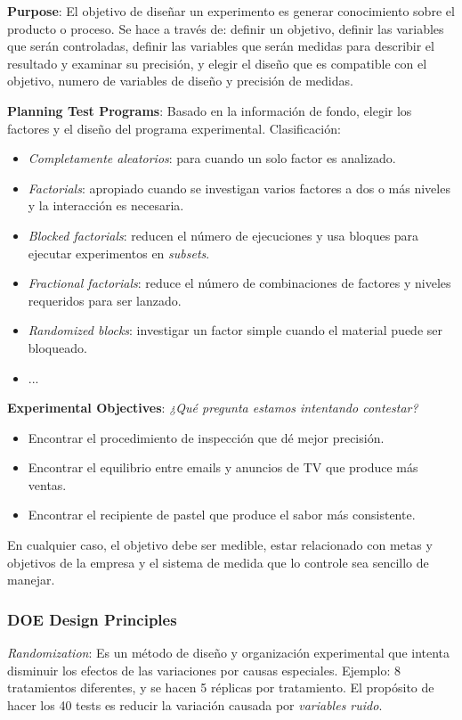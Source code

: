 \documentclass[]{article}
\begin{document}
\textbf{Purpose}: El objetivo de diseñar un experimento es generar conocimiento sobre el producto o proceso. Se hace a través de: definir un objetivo, definir las variables que serán controladas, definir las variables que serán medidas para describir el resultado y examinar su precisión, y elegir el diseño que es compatible con el objetivo, numero de variables de diseño y precisión de medidas.

\textbf{Planning Test Programs}: Basado en la información de fondo, elegir los factores y el diseño del programa experimental. Clasificación:
\begin{itemize}
	\item \textit{Completamente aleatorios}: para cuando un solo factor es analizado.
	\item \textit{Factorials}: apropiado cuando se investigan varios factores a dos o más niveles y la interacción es necesaria.
	\item \textit{Blocked factorials}: reducen el número de ejecuciones y usa bloques para ejecutar experimentos en \textit{subsets}.
	\item \textit{Fractional factorials}: reduce el número de combinaciones de factores y niveles requeridos para ser lanzado.
	\item \textit{Randomized blocks}: investigar un factor simple cuando el material puede ser bloqueado.
	\item ...
\end{itemize}
 
\textbf{Experimental Objectives}: \textit{¿Qué pregunta estamos intentando contestar?} 
\begin{itemize}
	\item Encontrar el procedimiento de inspección que dé mejor precisión.
	\item Encontrar el equilibrio entre emails y anuncios de TV que produce más ventas.
	\item Encontrar el recipiente de pastel que produce el sabor más consistente.
\end{itemize}
En cualquier caso, el objetivo debe ser medible, estar relacionado con metas y objetivos de la empresa y el sistema de medida que lo controle sea sencillo de manejar.

\subsubsection{DOE Design Principles}

\textit{Randomization}: Es un método de diseño y organización experimental que intenta disminuir los efectos de las variaciones por causas especiales. Ejemplo: 8 tratamientos diferentes, y se hacen 5 réplicas por tratamiento. El propósito de hacer los 40 tests es reducir la variación causada por \textit{variables ruido}.
\end{document}
